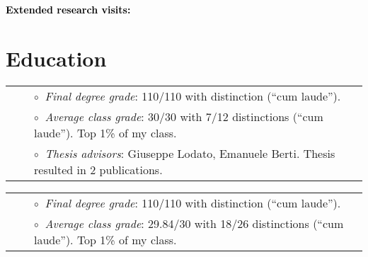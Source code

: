 \documentclass[a4paper]{moderncv}
\begin{document}
\vspace{0.2cm}
\textbf{\textcolor{black}{Extended research visits:}}\vspace{0.05cm}\\
 \vspace{-0.1cm}
 \vspace{-0.1cm}


\section{Education}

\vspace{-0.1cm}
\begin{tabular}{rcl}
&\hspace{0.4cm} &$\circ\;\;${\textit{Final degree grade}}: 110/110 with distinction (``cum laude'').\\
&\hspace{0.4cm} &$\circ\;\;${\textit{Average class grade}}: 30/30 with 7/12 distinctions (``cum laude''). Top 1\% of my class.\\
&\hspace{0.4cm} &$\circ\;\;${\textit{Thesis advisors}}: Giuseppe Lodato, Emanuele Berti. Thesis resulted in 2 publications.\\
\end{tabular}

\vspace{0.2cm}
\vspace{-0.1cm}
\begin{tabular}{rcl}
&\hspace{0.4cm} &$\circ\;\;${\textit{Final degree grade}}: 110/110 with distinction (``cum laude'').\\
&\hspace{0.4cm} &$\circ\;\;${\textit{Average class grade}}: 29.84/30 with 18/26 distinctions (``cum laude''). Top 1\% of my class.\\
\end{tabular}
\end{document}
